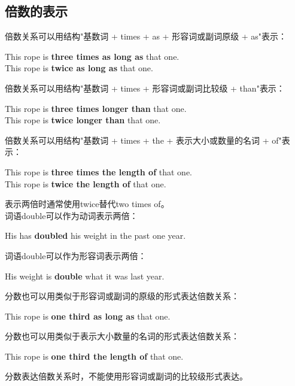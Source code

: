 \documentclass[UTF8]{ctexart}
\newcommand{\littf}[1]{{\hspace{3pt}\ttfamily #1}}
\begin{document}
\newpage

\subsection{倍数的表示}
    倍数关系可以用结构\littf{"\hspace{0pt}基数词 + times + as + 形容词或副词原级 + as"}表示：
    \begin{center}
        \large\ttfamily
        This rope is \textbf{three times as long as} that one.\\[3mm]
        This rope is \textbf{twice as long as} that one.\\[6mm]
    \end{center}
    倍数关系可以用结构\littf{"\hspace{0pt}基数词 + times + 形容词或副词比较级 + than"}表示：
    \begin{center}
        \large\ttfamily
        This rope is \textbf{three times longer than} that one.\\[3mm]
        This rope is \textbf{twice longer than} that one.\\[6mm]
    \end{center}
    倍数关系可以用结构\littf{"\hspace{0pt}基数词 + times + the + 表示大小或数量的名词 + of"}表示：
    \begin{center}
        \large\ttfamily
        This rope is \textbf{three times the length of} that one.\\[3mm]
        This rope is \textbf{twice the length of} that one.\\[6mm]
    \end{center}
    表示两倍时通常使用\littf{twice}替代\littf{two times of}。\\[3mm]
    词语\littf{double}可以作为动词表示两倍：
    \begin{center}
        \large\ttfamily
        His has \textbf{doubled} his weight in the past one year.\\[6mm]
    \end{center}
    词语\littf{double}可以作为形容词表示两倍：
    \begin{center}
        \large\ttfamily
        His weight is \textbf{double} what it was last year.\\[6mm]
    \end{center}
    分数也可以用类似于形容词或副词的原级的形式表达倍数关系：
    \begin{center}
        \large\ttfamily
        This rope is \textbf{one third as long as} that one.\\[6mm]
    \end{center}
    分数也可以用类似于表示大小数量的名词的形式表达倍数关系：
    \begin{center}
        \large\ttfamily
        This rope is \textbf{one third the length of} that one.\\[6mm]
    \end{center}
    分数表达倍数关系时，不能使用形容词或副词的比较级形式表达。
\end{document}
